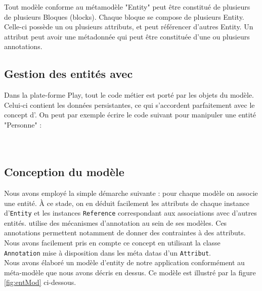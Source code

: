 Tout modèle conforme au métamodèle "Entity" peut être constitué de plusieurs de plusieurs Bloques (blocks). Chaque bloque se compose de plusieurs Entity. Celle-ci possède un ou plusieurs attributs, et peut référencer d'autres Entity. Un attribut peut avoir une métadonnée qui peut être constituée d'une ou plusieurs annotations.   

\subsection{Gestion des entités avec \kwplay{}}
Dans la plate-forme Play, tout le code métier est porté par les objets du modèle. Celui-ci contient les données persistantes, ce qui s'accordent parfaitement avec le concept d'\kwentity.  
On peut par exemple écrire le code suivant pour manipuler une entité "Personne" :\\
         
\\
\\
\subsection{Conception du modèle}
Nous avons employé la simple démarche suivante : pour chaque modèle \kwplay{} on associe une entité. À ce stade, on en déduit facilement les attributs de chaque instance d'\verb+Entity+ et les instances \verb+Reference+ correspondant aux associations avec d'autres entités. \kwplay{} utilise des mécanismes d'annotation au sein de ses modèles. Ces annotations permettent notamment de donner des contraintes à des attributs. Nous avons facilement pris en compte ce concept en utilisant la classe \verb+Annotation+ mise à disposition dans les méta datas d'un \verb+Attribut+.\\
Nous avons élaboré un modèle d'entity de notre application conformément au méta-modèle que nous avons décris en dessus. Ce modèle est illustré par la figure \ref{fig:entMod} ci-dessous.

